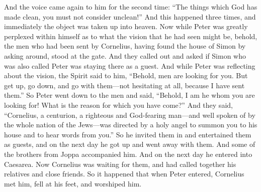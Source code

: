 \begin{biblechapter}
\verse And the voice came again to him for the second time: “The things which God has made clean, you must not consider unclean!”
\verse And this happened three times, and immediately the object was taken up into heaven.
\verse Now while Peter was greatly perplexed within himself as to what the vision that he had seen might be, behold, the men who had been sent by Cornelius, having found the house of Simon by asking around, stood at the gate.
\verse And they called out and asked if Simon who was also called Peter was staying there as a guest.
\verse And while Peter was reflecting about the vision, the Spirit said to him, “Behold, men are looking for you.
\verse But get up, go down, and go with them—not hesitating at all, because I have sent them.”
\verse So Peter went down to the men and said, “Behold, I am he whom you are looking for! What is the reason for which you have come?”
\verse And they said, “Cornelius, a centurion, a righteous and God-fearing man—and well spoken of by the whole nation of the Jews—was directed by a holy angel to summon you to his house and to hear words from you.”
\verse So he invited them in and entertained them as guests, and on the next day he got up and went away with them. And some of the brothers from Joppa accompanied him.
\verse And on the next day he entered into Caesarea.
 Now Cornelius was waiting for them, and had called together his relatives and close friends.
\verse So it happened that when Peter entered, Cornelius met him, fell at his feet, and worshiped him.

\end{biblechapter}
